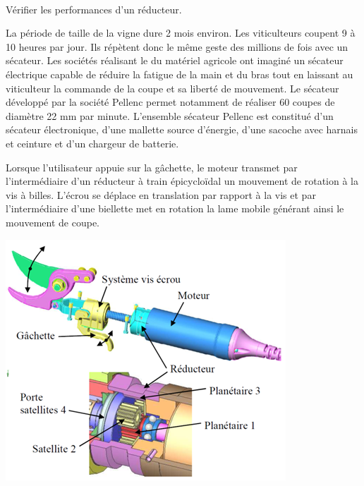 \documentclass[10pt,fleqn]{article} %
\begin{document}

\vspace{7cm}
\pagestyle{fancy}
\thispagestyle{plain}


\def\columnseprulecolor{\color{ocre}}
\setlength{\columnseprule}{0.4pt} 

\begin{multicols}{2}

\begin{obj}~\\
Vérifier les performances d'un réducteur.
\end{obj}


La période de taille de la vigne dure 2 mois environ. Les viticulteurs coupent 9 à 10 heures par jour. Ils répètent donc le même geste des millions de fois avec un sécateur. Les sociétés réalisant le du matériel agricole ont imaginé un sécateur électrique capable de réduire la fatigue de la main et du bras tout en laissant au viticulteur la commande de la coupe et sa liberté de mouvement. Le sécateur développé par la société Pellenc permet notamment de réaliser 60 coupes de diamètre 22 mm par minute. L’ensemble sécateur Pellenc est constitué d’un sécateur électronique, d’une mallette source d’énergie, d’une sacoche avec harnais et ceinture et d’un chargeur de batterie.


Lorsque l’utilisateur appuie sur la gâchette, le moteur transmet par l’intermédiaire d’un réducteur à train épicycloïdal un mouvement de rotation à la vis à billes. L’écrou se déplace en translation par rapport à la vis et par l’intermédiaire d’une biellette met en rotation la lame mobile générant ainsi le mouvement de coupe. 

\begin{center}
 \includegraphics[width=.95\linewidth]{images/secateur2}
\end{center}





\end{multicols}
\end{document}
